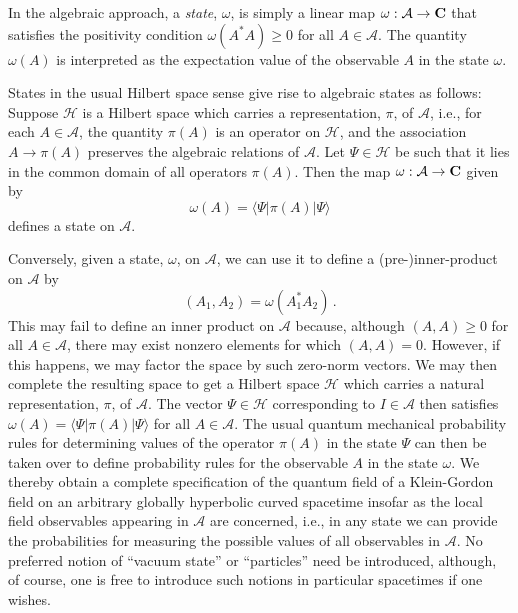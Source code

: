 In the algebraic approach, a {\it state}, $\omega$, is simply a linear
map $\omega: {\mathcal A} \rightarrow {\bf C}$ that satisfies the
positivity condition $\omega (A^* A) \geq 0$ for all $A \in {\mathcal
A}$. The quantity $\omega(A)$ is interpreted as the expectation value
of the observable $A$ in the state $\omega$. 

States in the usual Hilbert space sense give rise to algebraic states
as follows: Suppose $\mathcal H$ is a Hilbert space which carries a
representation, $\pi$, of $\mathcal A$, i.e., for each $A \in
{\mathcal A}$, the quantity $\pi (A)$ is an operator on $\mathcal H$,
and the association $A \rightarrow \pi(A)$ preserves the algebraic
relations of $\mathcal A$. Let $\Psi \in {\mathcal H}$ be such that it
lies in the common domain of all operators $\pi (A)$. Then the map
$\omega: {\mathcal A} \rightarrow {\bf C}$ given by
\begin{equation}
\omega(A) = \langle \Psi | \pi (A) | \Psi \rangle
\end{equation}
defines a state on $\mathcal A$.

Conversely, given a state, $\omega$, on $\mathcal A$, we can use it to
define a (pre-)inner-product on $\mathcal A$ by
\begin{equation}
(A_1, A_2) = \omega(A_1^* A_2) \, .
\end{equation}
This may fail to define an inner product on $\mathcal A$ because,
although $(A,A) \geq 0$ for all $A \in {\mathcal A}$, there may exist
nonzero elements for which $(A,A) = 0$. However, if this happens, we
may factor the space by such zero-norm vectors. We may then complete
the resulting space to get a Hilbert space $\mathcal H$ which carries
a natural representation, $\pi$, of $\mathcal A$. The vector $\Psi \in
{\mathcal H}$ corresponding to $I \in {\mathcal A}$ then satisfies
$\omega(A) = \langle \Psi | \pi (A) | \Psi \rangle$ for all $A \in
{\mathcal A}$. The usual quantum mechanical probability rules for
determining values of the operator $\pi(A)$ in the state $\Psi$ can
then be taken over to define probability rules for the observable $A$
in the state $\omega$. We thereby obtain a complete specification of
the quantum field of a Klein-Gordon field on an arbitrary globally
hyperbolic curved spacetime insofar as the local field observables
appearing in $\mathcal A$ are concerned, i.e., in any state we can
provide the probabilities for measuring the possible values of all
observables in $\mathcal A$. No preferred notion of ``vacuum state''
or ``particles'' need be introduced, although, of course, one is free
to introduce such notions in particular spacetimes if one wishes.

